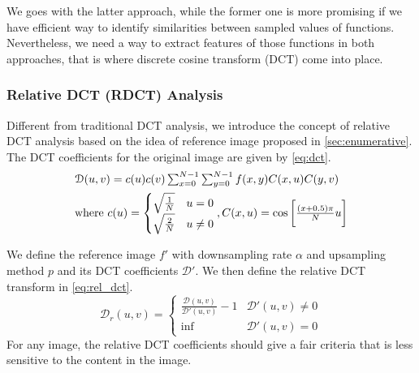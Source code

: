 \documentclass[journal,conference]{IEEEtran}
\begin{document}
We goes with the latter approach, while the former one is more promising if we have efficient way to identify similarities between sampled values of functions.
Nevertheless, we need a way to extract features of those functions in both approaches, that is where discrete cosine transform (DCT) come into place.

\subsubsection{Relative DCT (RDCT) Analysis}
Different from traditional DCT analysis, we introduce the concept of relative DCT analysis based on the idea of reference image proposed in \ref{sec:enumerative}.
The DCT coefficients for the original image are given by \eqref{eq:dct}.
\begin{equation}
	\begin{array}{l}
		\mathcal{D}(u, v) = c(u)c(v)\sum_{x=0}^{N-1}\sum_{y=0}^{N-1}f(x, y)C(x, u)C(y, v)\\
		\vspace{-0.75em}\\
		\text{where } c(u) = \begin{cases}
			\sqrt{\frac{1}{N}} & u = 0 \\
			\sqrt{\frac{2}{N}} & u \neq 0
		\end{cases}, C(x, u) = \cos\bigg[\frac{(x+0.5)\pi}{N}u\bigg]
	\end{array}
	\label{eq:dct}
\end{equation}

We define the reference image $f'$ with downsampling rate $\alpha$ and upsampling method $p$ and its DCT coefficients $\mathcal{D}'$.
We then define the relative DCT transform in \eqref{eq:rel_dct}.
\begin{equation}
	\mathcal{D}_r(u, v) = \begin{cases}
		\frac{\mathcal{D}(u, v)}{\mathcal{D}'(u, v)} - 1 & \mathcal{D}'(u, v) \neq 0 \\
		\inf & \mathcal{D}'(u, v) = 0
	\end{cases}
	\label{eq:rel_dct}
\end{equation}
For any image, the relative DCT coefficients should give a fair criteria that is less sensitive to the content in the image.
\end{document}

